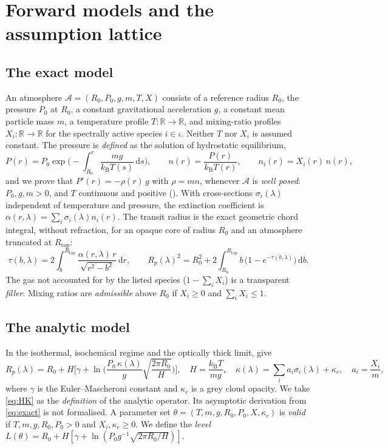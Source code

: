 \documentclass[11pt]{article}
\theoremstyle{definition}
\theoremstyle{remark}
\DeclareRobustCommand{\lean}[1]{{\small\ttfamily\seqsplit{#1}}}
\newcommand{\dd}{\mathrm{d}}
\newcommand{\kB}{k_{\mathrm B}}
\newcommand{\Rtop}{R_{\mathrm{top}}}
\newcommand{\R}{\mathbb{R}}
\begin{document}
\section{Forward models and the assumption lattice}\label{sec:models}

\subsection{The exact model}

An atmosphere $\mathcal A=(R_0,P_0,g,m,T,X)$ consists of a reference radius $R_0$, the pressure
$P_0$ at $R_0$, a constant gravitational acceleration $g$, a constant mean particle mass $m$,
a temperature profile $T:\R\to\R$, and mixing-ratio profiles $X_i:\R\to\R$ for the
spectrally active species $i\in\iota$. Neither $T$ nor $X_i$ is assumed constant. The pressure
is \emph{defined} as the solution of hydrostatic equilibrium,
\begin{equation}
P(r) = P_0\exp\!\Big(-\!\int_{R_0}^{r}\frac{m g}{\kB T(s)}\,\dd s\Big),\qquad
n(r)=\frac{P(r)}{\kB T(r)},\qquad n_i(r)=X_i(r)\,n(r),
\end{equation}
and we prove that $P'(r) = -\rho(r)\,g$ with $\rho=m n$, whenever $\mathcal A$ is
\emph{well posed}: $P_0,g,m>0$, and $T$ continuous and positive (\lean{hasDerivAt\_pressure}).
With cross-sections $\sigma_i(\lambda)$ independent of temperature and pressure, the extinction
coefficient is $\alpha(r,\lambda)=\sum_i\sigma_i(\lambda)n_i(r)$. The transit radius is the
exact geometric chord integral, without refraction, for an opaque core of radius $R_0$ and an
atmosphere truncated at $\Rtop$:
\begin{equation}\label{eq:exact}
\tau(b,\lambda)=2\int_b^{\Rtop}\frac{\alpha(r,\lambda)\,r}{\sqrt{r^2-b^2}}\,\dd r,\qquad
R_p(\lambda)^2 = R_0^2 + 2\int_{R_0}^{\Rtop} b\,\big(1-e^{-\tau(b,\lambda)}\big)\,\dd b .
\end{equation}
The gas not accounted for by the listed species ($1-\sum_i X_i$) is a transparent
\emph{filler}. Mixing ratios are \emph{admissible} above $R_0$ if $X_i\ge 0$ and
$\sum_iX_i\le 1$.

\subsection{The analytic model}

In the isothermal, isochemical regime and the optically thick limit, \citet{HengKitzmann2017}
give
\begin{equation}\label{eq:HK}
R_p(\lambda)=R_0+H\Big[\gamma+\ln\Big(\frac{P_0\,\kappa(\lambda)}{g}\sqrt{\frac{2\pi R_0}{H}}\Big)\Big],\quad
H=\frac{\kB T}{m g},\quad \kappa(\lambda)=\sum_i a_i\sigma_i(\lambda)+\kappa_c,\quad a_i=\frac{X_i}{m},
\end{equation}
where $\gamma$ is the Euler--Mascheroni constant and $\kappa_c$ is a grey cloud opacity. We
take \eqref{eq:HK} as the \emph{definition} of the analytic operator. Its asymptotic derivation
from \eqref{eq:exact} is not formalised. A parameter set
$\theta=(T,m,g,R_0,P_0,X,\kappa_c)$ is \emph{valid} if $T,m,g,R_0,P_0>0$ and
$X_i,\kappa_c\ge 0$. We define the \emph{level}
$L(\theta)=R_0+H[\gamma+\ln(P_0g^{-1}\sqrt{2\pi R_0/H})]$.
\end{document}
